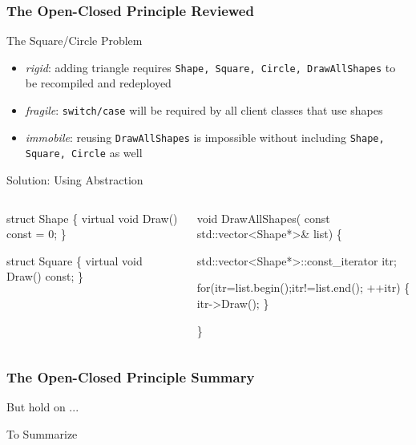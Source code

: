 \documentclass[9pt]{beamer}
\begin{document}
\begin{frame}[fragile]
  \frametitle{The Open-Closed Principle Reviewed}
  \begin{block}{The Square/Circle Problem}
    \begin{itemize}
    \item \emph{rigid}: adding triangle requires \texttt{Shape, Square, Circle, DrawAllShapes} to be recompiled and redeployed
    \item \emph{fragile}: \texttt{switch/case} will be required by all client classes that use shapes
    \item \emph{immobile}: reusing \texttt{DrawAllShapes} is impossible without including \texttt{Shape, Square, Circle} as well
    \end{itemize}
  \end{block}
\pause
\begin{block}{Solution: Using Abstraction}
    
    \begin{columns}[t]
      \begin{column}{.45\textwidth}
        \small
        \begin{semiverbatim}
struct Shape \{ 
  virtual void Draw() const = 0; 
\}

struct Square \{ 
  virtual void Draw() const; 
\}
        \end{semiverbatim}
      \end{column}
      \begin{column}{.45\textwidth}
        \scriptsize
        \begin{semiverbatim}
void DrawAllShapes(
  const std::vector<Shape*>& list) \{

  std::vector<Shape*>::const_iterator itr; 

  for(itr=list.begin();itr!=list.end(); ++itr) 
  \{ 
    itr->Draw(); 
  \}

\}
        \end{semiverbatim}
      \end{column}

    \end{columns}

  \end{block}



\end{frame}

\begin{frame}
  \frametitle{The Open-Closed Principle Summary}
\begin{block}{But hold on ...}
  
\end{block}
\vfill
\pause
\begin{block}{To Summarize}
  
\end{block}
\end{frame}
\end{document}
